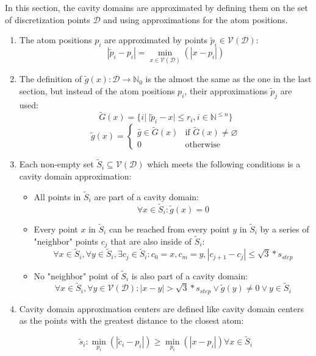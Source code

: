 In this section, the cavity domains are approximated by defining them on the set of discretization points $\mathcal{D}$ and using approximations for the atom positions.
\begin{enumerate}
\item {The atom positions $p_i$ are approximated by points $\tilde{p}_i \in \mathcal{V}(\mathcal{D})$:
\[|\tilde{p}_{i}-p_{i}| = \min_{x \in \mathcal{V}(\mathcal{D})}(|x-p_{i}|)\]
}
\item {The definition of $\tilde{g}(x)\colon \mathcal{D} \rightarrow \mathbb{N}_0$ is the almost the same as the one in the last section, but instead of the atom positions $p_i$, their approximations $\tilde{p}_j$ are used:
\[\tilde{G}(x) = \{i|~ |\tilde{p}_{i}-x| \le r_i,i \in \mathbb{N}^{\le n}\}\]
  \[\tilde{g}(x) = \left\{\begin{array}{ll}\hat{g} \in \tilde{G}(x)&\text{if } \tilde{G}(x) \ne \varnothing\\0&\text{otherwise}\end{array}\right.\]
}
\item Each non-empty set $\tilde{S}_i \subseteq \mathcal{V}(\mathcal{D})$ which meets the following conditions is a cavity domain approximation:
\begin{itemize}
  \item{All points in $\tilde{S}_i$ are part of a cavity domain:
  \[\forall x \in \tilde{S}_i\colon \tilde{g}(x) = 0\]}
\item{Every point $x$ in $\tilde{S}_i$ can be reached from every point $y$ in $\tilde{S}_i$ by a series of "neighbor" points $c_j$ that are also inside of $\tilde{S}_i$:
\[
\forall x \in \tilde{S}_i, \forall y \in \tilde{S}_i,\exists c_j \in \tilde{S}_i\colon c_0 = x, c_m = y,|c_{j+1}-c_j| \le \sqrt{3}*s_{step}
\]
}
\item{No "neighbor" point of $\tilde{S}_i$ is also part of a cavity domain:
\[
\forall x \in \tilde{S}_i, \forall y \in \mathcal{V}(\mathcal{D})\colon |x-y| > \sqrt{3}*s_{step}  \lor \tilde{g}(y)\ne0  \lor y \in \tilde{S}_i
\]
}
\end{itemize}
\item{
Cavity domain approximation centers are defined like cavity domain centers as the points with the greatest distance to the closest atom:

  \[\tilde{s}_i\colon \min_{p_i}(|\tilde{c}_i-p_i|) \ge \min_{p_i}(|x-p_i|) \forall x \in \tilde{S}_i\]
}
\end{enumerate}



